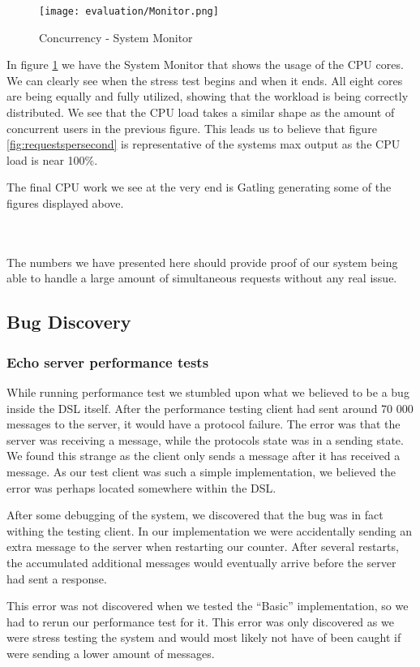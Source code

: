 \begin{figure}[H]
  \centering
  \texttt{[image: evaluation/Monitor.png]}
  \caption{Concurrency - System Monitor}
  \label{fig:monitor}
\end{figure}
In figure \ref{fig:monitor} we have the System Monitor that shows the usage of the CPU cores. We can clearly see when the stress test begins  and when it ends. All eight cores are being equally and fully utilized, showing that the workload is being correctly distributed. We see that the CPU load takes a similar shape as the amount of concurrent users in the previous figure. This leads us to believe that figure \ref{fig:requestspersecond} is representative of the systems max output as the CPU load is near 100\%.

The final CPU work we see at the very end is Gatling generating some of the figures displayed above.

\\\\
The numbers we have presented here should provide proof of our system being able to handle a large amount of simultaneous requests without any real issue.
\subsection{Bug Discovery}
\subsubsection{Echo server performance tests}
While running performance test we stumbled upon what we believed to be a bug inside the DSL itself. After the performance testing client had sent around 70 000 messages to the server, it would have a protocol failure. The error was that the server was receiving a message, while the protocols state was in a sending state. We found this strange as the client only sends a message after it has received a message. As our test client was such a simple implementation, we believed the error was perhaps located somewhere within the DSL.
 
After some debugging of the system, we discovered that the bug was in fact withing the testing client. In our implementation we were accidentally sending an extra message to the server when restarting our counter. After several restarts, the accumulated additional messages would eventually arrive before the server had sent a response.

This error was not discovered when we tested the ``Basic'' implementation, so we had to rerun our performance test for it. This error was only discovered as we were stress testing the system and would most likely not have of been caught if were sending a lower amount of messages.

